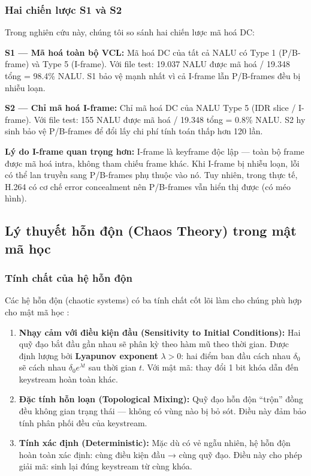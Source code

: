 \subsubsection{Hai chiến lược S1 và S2}

Trong nghiên cứu này, chúng tôi so sánh hai chiến lược mã hoá DC:

\textbf{S1 --- Mã hoá toàn bộ VCL:}
Mã hoá DC của tất cả NALU có Type 1 (P/B-frame) và Type 5 (I-frame).
Với file test: 19.037 NALU được mã hoá / 19.348 tổng = 98.4\% NALU.
S1 bảo vệ mạnh nhất vì cả I-frame lẫn P/B-frames đều bị nhiễu loạn.

\textbf{S2 --- Chỉ mã hoá I-frame:}
Chỉ mã hoá DC của NALU Type 5 (IDR slice / I-frame).
Với file test: 155 NALU được mã hoá / 19.348 tổng = 0.8\% NALU.
S2 hy sinh bảo vệ P/B-frames để đổi lấy chi phí tính toán thấp hơn 120 lần.

\textbf{Lý do I-frame quan trọng hơn:} I-frame là keyframe độc lập --- toàn bộ
frame được mã hoá intra, không tham chiếu frame khác. Khi I-frame bị nhiễu loạn,
lỗi có thể lan truyền sang P/B-frames phụ thuộc vào nó. Tuy nhiên, trong thực tế,
H.264 có cơ chế error concealment nên P/B-frames vẫn hiển thị được (có méo hình).

\subsection{Lý thuyết hỗn độn (Chaos Theory) trong mật mã học}

\subsubsection{Tính chất của hệ hỗn độn}

Các hệ hỗn độn (chaotic systems) có ba tính chất cốt lõi làm cho chúng phù hợp
cho mật mã học \cite{chen_chaos_video}:

\begin{enumerate}
  \item \textbf{Nhạy cảm với điều kiện đầu (Sensitivity to Initial Conditions):}
        Hai quỹ đạo bắt đầu gần nhau sẽ phân kỳ theo hàm mũ theo thời gian.
        Được định lượng bởi \textbf{Lyapunov exponent} $\lambda > 0$: hai điểm
        ban đầu cách nhau $\delta_0$ sẽ cách nhau $\delta_0 e^{\lambda t}$ sau
        thời gian $t$. Với mật mã: thay đổi 1 bit khóa dẫn đến keystream
        hoàn toàn khác.

  \item \textbf{Đặc tính hỗn loạn (Topological Mixing):} Quỹ đạo hỗn độn
        ``trộn'' đồng đều không gian trạng thái --- không có vùng nào bị bỏ sót.
        Điều này đảm bảo tính phân phối đều của keystream.

  \item \textbf{Tính xác định (Deterministic):} Mặc dù có vẻ ngẫu nhiên,
        hệ hỗn độn hoàn toàn xác định: cùng điều kiện đầu → cùng quỹ đạo.
        Điều này cho phép giải mã: sinh lại đúng keystream từ cùng khóa.
\end{enumerate}

